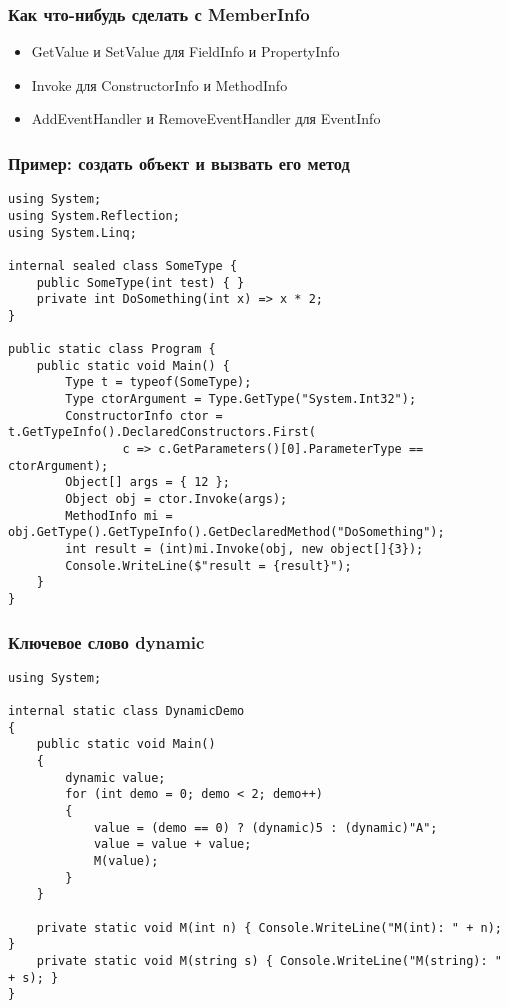 \documentclass[xetex,mathserif,serif]{beamer}
\begin{document}
	\begin{frame}
		\frametitle{Как что-нибудь сделать с MemberInfo}
		\begin{itemize}
			\item GetValue и SetValue для FieldInfo и PropertyInfo
			\item Invoke для ConstructorInfo и MethodInfo
			\item AddEventHandler и RemoveEventHandler для EventInfo
		\end{itemize}
	\end{frame}

	\begin{frame}[fragile]
		\frametitle{Пример: создать объект и вызвать его метод}
		\begin{scriptsize}
			\begin{verbatim}
using System;
using System.Reflection;
using System.Linq;

internal sealed class SomeType {
    public SomeType(int test) { }
    private int DoSomething(int x) => x * 2;
}

public static class Program {
    public static void Main() {
        Type t = typeof(SomeType);
        Type ctorArgument = Type.GetType("System.Int32");
        ConstructorInfo ctor = t.GetTypeInfo().DeclaredConstructors.First(
                c => c.GetParameters()[0].ParameterType == ctorArgument);
        Object[] args = { 12 };
        Object obj = ctor.Invoke(args);
        MethodInfo mi = obj.GetType().GetTypeInfo().GetDeclaredMethod("DoSomething");
        int result = (int)mi.Invoke(obj, new object[]{3});
        Console.WriteLine($"result = {result}");
    }
}
			\end{verbatim}
		\end{scriptsize}
	\end{frame}

	\begin{frame}[fragile]
		\frametitle{Ключевое слово dynamic}
		\begin{scriptsize}
			\begin{verbatim}
using System;

internal static class DynamicDemo
{
    public static void Main()
    {
        dynamic value;
        for (int demo = 0; demo < 2; demo++)
        {
            value = (demo == 0) ? (dynamic)5 : (dynamic)"A";
            value = value + value;
            M(value);
        }
    }

    private static void M(int n) { Console.WriteLine("M(int): " + n); }
    private static void M(string s) { Console.WriteLine("M(string): " + s); }
}
			\end{verbatim}
		\end{scriptsize}
	\end{frame}
\end{document}
